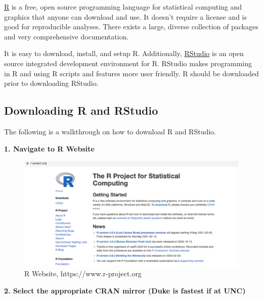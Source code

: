 \documentclass[
]{book}
\begin{document}
\href{https://www.r-project.org}{R} is a free, open source programming language for statistical computing and graphics that anyone can download and use. It doesn't require a license and is good for reproducible analyses. There exists a large, diverse collection of packages and very comprehensive documentation.

It is easy to download, install, and setup R. Additionally, \href{https://www.rstudio.com}{RStudio} is an open source integrated development environment for R. RStudio makes programming in R and using R scripts and features more user friendly. R should be downloaded prior to downloading RStudio.

\hypertarget{downloading-r-and-rstudio}{%
\subsection{Downloading R and RStudio}\label{downloading-r-and-rstudio}}

The following is a walkthrough on how to download R and RStudio.

\textbf{1. Navigate to R Website}

\begin{figure}
\includegraphics[width=17.71in]{_book/test1_files/figure-html/r_website} \caption{R Website, https://www.r-project.org}\label{fig:website}
\end{figure}

\textbf{2. Select the appropriate CRAN mirror (Duke is fastest if at UNC)}
\end{document}
